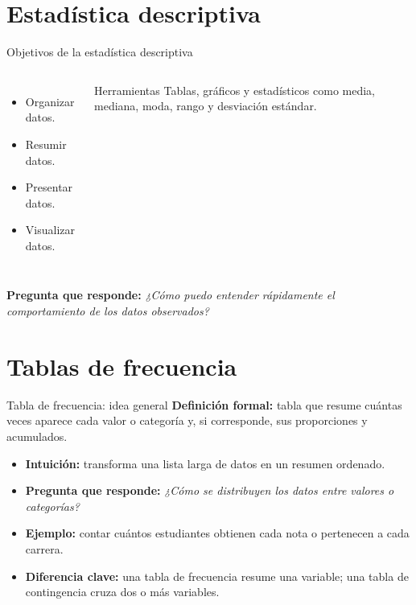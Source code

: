 \documentclass[aspectratio=169,11pt]{beamer}
\newcommand{\pregunta}[1]{\textbf{Pregunta que responde:} \emph{#1}}
\newcommand{\diferencia}[1]{\textbf{Diferencia clave:} #1}
\begin{document}
\section{Estadística descriptiva}

\begin{frame}{Objetivos de la estadística descriptiva}
\begin{columns}[T]
\begin{itemize}
  \item Organizar datos.
  \item Resumir datos.
  \item Presentar datos.
  \item Visualizar datos.
\end{itemize}
\begin{block}{Herramientas}
Tablas, gráficos y estadísticos como media, mediana, moda, rango y desviación estándar.
\end{block}
\end{columns}
\vspace{0.5em}
\pregunta{¿Cómo puedo entender rápidamente el comportamiento de los datos observados?}
\end{frame}

\section{Tablas de frecuencia}

\begin{frame}{Tabla de frecuencia: idea general}
\textbf{Definición formal:} tabla que resume cuántas veces aparece cada valor o categoría y, si corresponde, sus proporciones y acumulados.
\begin{itemize}
  \item \textbf{Intuición:} transforma una lista larga de datos en un resumen ordenado.
  \item \pregunta{¿Cómo se distribuyen los datos entre valores o categorías?}
  \item \textbf{Ejemplo:} contar cuántos estudiantes obtienen cada nota o pertenecen a cada carrera.
  \item \diferencia{una tabla de frecuencia resume una variable; una tabla de contingencia cruza dos o más variables.}
\end{itemize}
\end{frame}
\end{document}
